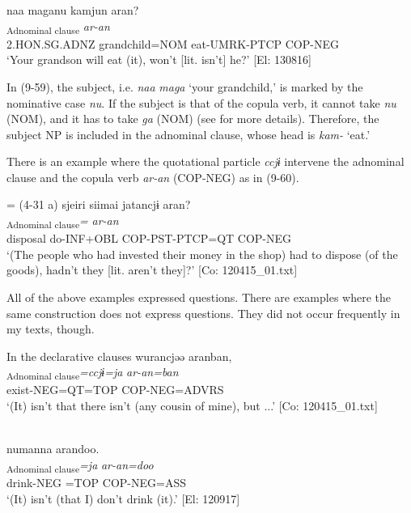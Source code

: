 \ea    \label{ex:9.59}
 \glll  naa  maganu  kamjun  aran?\\
    [\textit{naa}  \textit{maga=\Highlight{nu}}  \textit{kam-jur-n}]\textsubscript{Adnominal clause}  \textit{ar-an}\\
    2.HON.SG.ADNZ  grandchild=NOM  eat-UMRK-PTCP  COP-NEG\\
    \glt     ‘Your grandson will eat (it), won’t [lit. isn’t] he?’ [El: 130816]
\z

In (9-59), the subject, i.e. \textit{naa} \textit{maga} ‘your grandchild,’ is marked by the nominative case \textit{nu}. If the subject is that of the copula verb, it cannot take \textit{nu} (NOM), and it has to take \textit{ga} (NOM) (see  for more details). Therefore, the subject NP is included in the adnominal clause, whose head is \textit{kam-} ‘eat.’

There is an example where the quotational particle \textit{ccjɨ} intervene the adnominal clause and the copula verb \textit{ar-an} (COP-NEG) as in (9-60). 

\ea{} = (4-31 a) \label{ex:9.60}
 \glll  {\textbar}sjeiri{\textbar}  siimai  jatancjɨ  aran?\\
    [\textit{sjeiri}  \textit{sɨr-i+mai}  \textit{jar-tar-n}]\textsubscript{Adnominal clause}\textit{=}  \textit{ar-an}\\
    disposal  do-INF+OBL  COP-PST-PTCP=QT  COP-NEG\\
    \glt     ‘(The people who had invested their money in the shop) had to dispose (of the goods), hadn’t they [lit. aren’t they]?’ [Co: 120415\_01.txt]
\z

  All of the above examples expressed questions. There are examples where the same construction does not express questions. They did not occur frequently in my texts, though.

\ea   In the declarative clauses \label{ex:9.61}
\ea %
\glll   wurancjəə  aranban,\\
      [\textit{wur-an}]\textsubscript{Adnominal clause}\textit{=ccjɨ=ja}  \textit{ar-an=ban}\\
      exist-NEG=QT=TOP  COP-NEG=ADVRS\\
      \glt       ‘(It) isn’t that there isn’t (any cousin of mine), but ...’ [Co: 120415\_01.txt]

\ex{}\\
    \glll  numanna  arandoo.\\
      [\textit{num-an}]\textsubscript{Adnominal clause}\textit{=ja}  \textit{ar-an=doo}\\
      drink-NEG =TOP  COP-NEG=ASS\\
      \glt       ‘(It) isn’t (that I) don’t drink (it).’ [El: 120917]
    \z
\z

